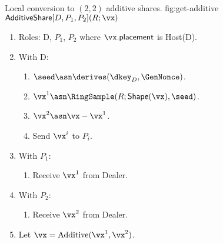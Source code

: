 \begin{Boxfig}{Local conversion to $(2,2)$ additive shares.
  }{fig:get-additive}
  {$\mathsf{AdditiveShare}[D, P_1, P_2](R; \vx)$}
  \begin{enumerate}
    \item Roles: D, $P_1$, $P_2$ where $\vx.\mathsf{placement}$ is Host(D).
    \item With D:
  \begin{enumerate}
    \item $\seed \asn \derives(\dkey_D, \GenNonce)$.
    \item $\vx^1 \asn \RingSample(R; \mathsf{Shape}(\vx), \seed)$.
    \item $\vx^2 \asn \vx - \vx^1$.
    \item Send $\vx^i$ to $P_i$.
  \end{enumerate}
  \item With $P_1$:
  \begin{enumerate}
      \item Receive $\vx^1$ from Dealer.
  \end{enumerate}
  \item With $P_2$:
  \begin{enumerate}
      \item Receive $\vx^2$ from Dealer.
  \end{enumerate}
  \item Let $\vx = \text{Additive}(\vx^1, \vx^2)$.
\end{enumerate}
\end{Boxfig}








